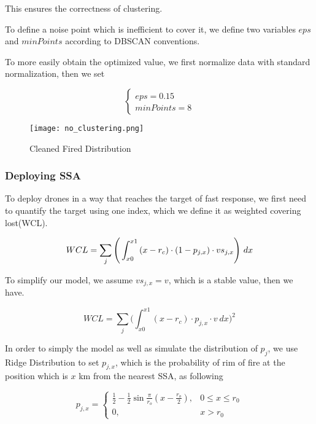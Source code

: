 \documentclass[../main]{subfiles}
\begin{document}
This ensures the correctness of clustering.

To define a noise point which is inefficient to cover it, we define two
variables \(eps\) and \(minPoints\) according to DBSCAN conventions.

To more easily obtain the optimized value, we first normalize data with
standard normalization, then we set

\begin{equation}
      \left\{
      \begin{array}{l}
            eps=0.15\\
            minPoints=8
      \end{array}
      \right.
\end{equation}

\begin{figure}[h!]
  \texttt{[image: no\_clustering.png]}
  \caption{Cleaned Fired Distribution}
\end{figure}

\subsubsection{Deploying SSA}

To deploy drones in a way that reaches the target of fast response, we
first need to quantify the target using one index, which we define it as
weighted covering lost(WCL).

\begin{equation}
WCL=\sum_j \Bigg(\int _{x0} ^{x1}  { (x-r_c)\cdot (1-p_{j,x})} \cdot vs_{j,x} \Bigg) \  dx \\ \\
\end{equation}

To simplify our model, we assume \(vs_{j,x}=v\), which is a stable
value, then we have.

\begin{equation}
WCL=\sum_j \Bigg(\int _{x0} ^{x1}  { (x-r_c)\cdot p_{j,x}} \cdot  v  \  dx\Bigg)^2
\end{equation}

In order to simply the model as well as simulate the distribution of
\(p_{j}\), we use Ridge Distribution to set \(p_{j,x}\), which is the
probability of rim of fire at the position which is \(x\) km from the
nearest SSA, as following

\begin{equation}
p_{j,x}=
\begin{cases}
\frac 1 2 - \frac 1 2 \sin \frac {\pi} {r_o}(x-\frac {r_o} {2} ) , & 0\le x \le r_0 \\ 
0 , & x > r_0
\end{cases}  
\end{equation}
\end{document}
